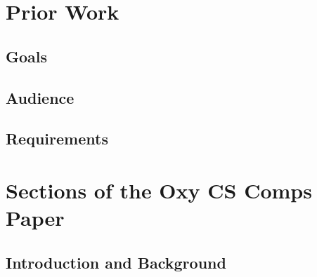 \documentclass[10pt,twocolumn]{article}
\begin{document}

\section{Prior Work}

\subsection{Goals}

\subsection{Audience}

\subsection{Requirements}

\section{Sections of the Oxy CS Comps Paper}

\subsection{Introduction and Background}
\end{document}
